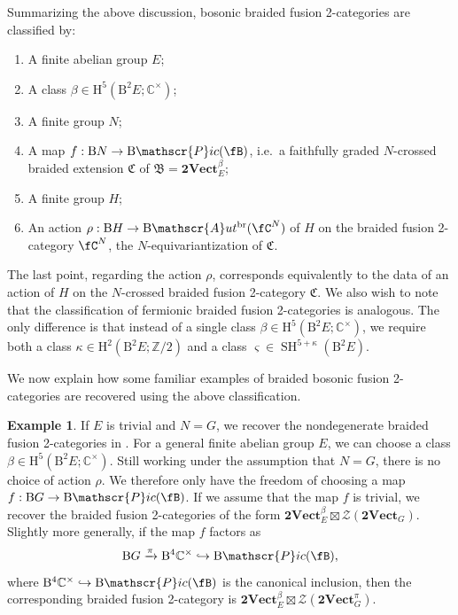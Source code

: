 \documentclass[11pt,reqno]{amsart}
\DeclareMathOperator{\br}{br}
\DeclareMathOperator{\SH}{SH}
\newcommand{\tVect}{\mathbf{2Vect}}
\newcommand{\sPic}{\mathscr{P}ic}
\newcommand{\cZ}{\mathcal{Z}}
\newcommand{\sAut}{\mathscr{A}ut}
\newcommand{\rH}{\mathrm{H}}
\newcommand{\rB}{\mathrm{B}}
\numberwithin{equation}{section}
\theoremstyle{plain}
\theoremstyle{definition}
\newtheorem{ex}[equation]{Example}
\begin{document}
Summarizing the above discussion, bosonic braided fusion 2-categories are classified by:
\begin{enumerate}
    \item A finite abelian group $E$;
    \item \label{number2} A class $\beta \in \rH^5(\rB^2 E; \mathbb{C}^\times)$;
    \item A finite group $N$;
    \item A map $f: \rB N \to \rB\sPic(\fB)$, i.e.\ a faithfully graded $N$-crossed braided extension $\mathfrak{C}$ of $\mathfrak{B} = \mathbf{2Vect}_E^{\beta}$;
    \item A finite group $H$;
    \item An action $\rho:\rB H \rightarrow \rB\sAut^{\br}(\fC^N)$ of $H$ on the braided fusion 2-category $\fC^N$, the $N$-equivariantization of $\mathfrak{C}$.
\end{enumerate}
The last point, regarding the action $\rho$, corresponds equivalently to the data of an action of $H$ on the $N$-crossed braided fusion 2-category $\mathfrak{C}$.
We also wish to note that the classification of fermionic braided fusion 2-categories is analogous. The only difference is that instead of a single class $\beta \in \rH^5(\rB^2 E; \mathbb{C}^\times)$, we require both a class $\kappa\in \rH^2(\rB^2 E;\mathbb{Z}/2)$ and a class $\varsigma \in \SH^{5+\kappa}(\rB^2 E)$.
 
We now explain how some familiar examples of braided bosonic fusion 2-categories are recovered using the above classification.

\begin{ex}
If $E$ is trivial and $N=G$, we recover the nondegenerate braided fusion 2-categories in . 
For a general finite abelian group $E$, we can choose a class $\beta\in \rH^5(\rB^2 E; \mathbb{C}^\times)$. Still working under the assumption that $N=G$, there is no choice of action $\rho$. We therefore only have the freedom of choosing a map $f:\rB G \rightarrow \rB\sPic(\fB)$.
If we assume that the map $f$ is trivial, we recover the braided fusion 2-categories of the form $\tVect^\beta_E\boxtimes \cZ(\tVect_G)$. Slightly more generally, if the map $f$ factors as $$\rB G\xrightarrow{\pi} \rB^4\mathbb{C}^{\times}\hookrightarrow \rB\sPic(\fB),$$ where $\rB^4\mathbb{C}^{\times}\hookrightarrow \rB\sPic(\fB)$ is the canonical inclusion, then the corresponding braided fusion 2-category is $\tVect^\beta_E\boxtimes \cZ(\tVect_G^{\pi})$.
\end{ex}
\end{document}
